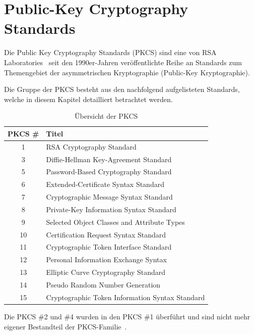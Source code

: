 \documentclass[10pt,a4paper]{article}
\begin{document}
\FloatBarrier

\section{Public-Key Cryptography Standards}
Die Public Key Cryptography Standards (PKCS) sind eine von RSA Laboratories~\cite{rsa-lab}
seit den 1990er-Jahren veröffentlichte Reihe an Standards zum Themengebiet der
asymmetrischen Kryptographie (Public-Key Kryptographie).

Die Gruppe der PKCS besteht aus den nachfolgend aufgelisteten Standards, welche in diesem
Kapitel detailliert betrachtet werden.

\begin{table}[ht]
    \centering
    \begin{tabular}{|c|l|} \hline
        \textbf{PKCS \#} & \textbf{Titel} \\\hline
        1 & RSA Cryptography Standard \\\hline
        3 & Diffie-Hellman Key-Agreement Standard \\\hline
        5 & Password-Based Cryptography Standard \\\hline
        6 & Extended-Certificate Syntax Standard \\\hline
        7 & Cryptographic Message Syntax Standard \\\hline
        8 & Private-Key Information Syntax Standard \\\hline
        9 & Selected Object Classes and Attribute Types \\\hline
        10 & Certification Request Syntax Standard \\\hline
        11 & Cryptographic Token Interface Standard \\\hline
        12 & Personal Information Exchange Syntax \\\hline
        13 & Elliptic Curve Cryptography Standard \\\hline
        14 & Pseudo Random Number Generation \\\hline
        15 & Cryptographic Token Information Syntax Standard \\\hline
    \end{tabular}
    \caption{Übersicht der PKCS}
    \label{tab:pkcs-overview}
\end{table}

\FloatBarrier

Die PKCS \#2 und \#4 wurden in den PKCS \#1 überführt und sind nicht mehr eigener Bestandteil
der PKCS-Familie~\cite[S.1]{kal91}.
\end{document}
